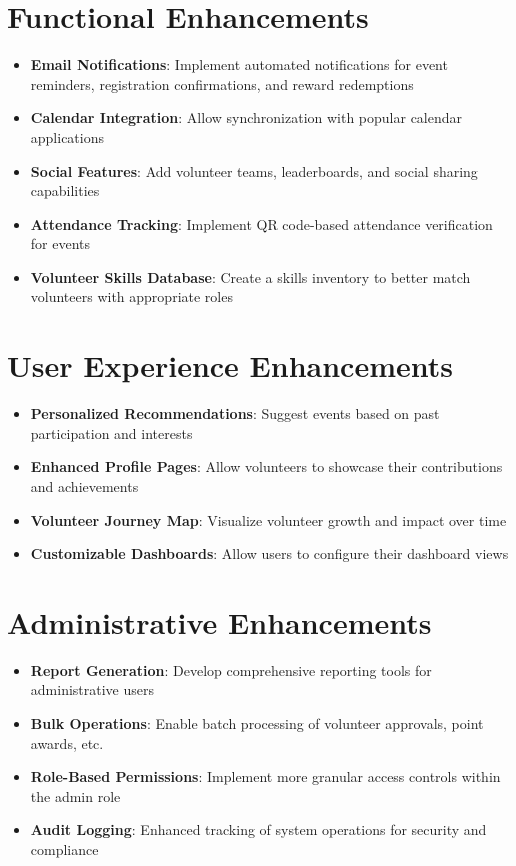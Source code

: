 \documentclass[12pt,a4paper]{report}
\begin{document}
\section{Functional Enhancements}
\begin{itemize}
    \item \textbf{Email Notifications}: Implement automated notifications for event reminders, registration confirmations, and reward redemptions
    \item \textbf{Calendar Integration}: Allow synchronization with popular calendar applications
    \item \textbf{Social Features}: Add volunteer teams, leaderboards, and social sharing capabilities
    \item \textbf{Attendance Tracking}: Implement QR code-based attendance verification for events
    \item \textbf{Volunteer Skills Database}: Create a skills inventory to better match volunteers with appropriate roles
\end{itemize}

\section{User Experience Enhancements}
\begin{itemize}
    \item \textbf{Personalized Recommendations}: Suggest events based on past participation and interests
    \item \textbf{Enhanced Profile Pages}: Allow volunteers to showcase their contributions and achievements
    \item \textbf{Volunteer Journey Map}: Visualize volunteer growth and impact over time
    \item \textbf{Customizable Dashboards}: Allow users to configure their dashboard views
\end{itemize}

\section{Administrative Enhancements}
\begin{itemize}
    \item \textbf{Report Generation}: Develop comprehensive reporting tools for administrative users
    \item \textbf{Bulk Operations}: Enable batch processing of volunteer approvals, point awards, etc.
    \item \textbf{Role-Based Permissions}: Implement more granular access controls within the admin role
    \item \textbf{Audit Logging}: Enhanced tracking of system operations for security and compliance
\end{itemize}
\end{document}
